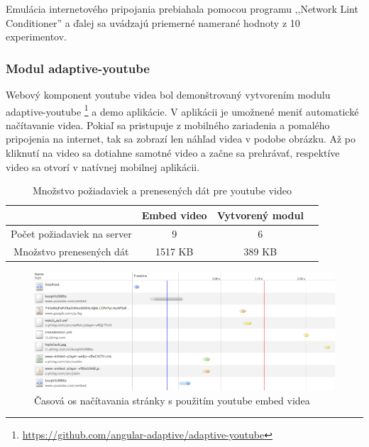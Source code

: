 Emulácia internetového pripojania prebiahala pomocou programu ,,Network Lint Conditioner'' a ďalej sa uvádzajú priemerné namerané hodnoty z 10 experimentov.

\subsubsection{Modul adaptive-youtube} %
\label{sub:adaptive_youtube}

Webový komponent youtube videa bol demonštrovaný vytvorením modulu adaptive-youtube \footnote{\url{https://github.com/angular-adaptive/adaptive-youtube}} a demo aplikácie. V aplikácii je umožnené meniť automatické načítavanie videa. Pokiaľ sa pristupuje z mobilného zariadenia a pomalého pripojenia na internet, tak sa zobrazí len náhľad videa v podobe obrázku. Až po kliknutí na video sa dotiahne samotné video a začne sa prehrávať, respektíve video sa otvorí v natívnej mobilnej aplikácii.

\begin{table}[H]
  \begin{tabular}{ |c|c|c|c| }
    \hline
    & Embed video & Vytvorený modul \\ \hline
    Počet požiadaviek na server & 9 & 6 \\  \hline
    Množstvo prenesených dát  & 1517 KB & 389 KB  \\
    \hline
  \end{tabular}
  \caption[Množstvo požiadaviek a prenesených dát pre youtube video]{Množstvo požiadaviek a prenesených dát pre youtube video}
\end{table}

\begin{figure}[H]
  \centering
  \includegraphics[width=1.0\textwidth]{img/load/timeline-y-e.png}
  \caption[Časová os načítavania stránky s použitím youtube embed videa]{
    Časová os načítavania stránky s použitím youtube embed videa}
  \label{fig: timeline-y-e}
\end{figure}

